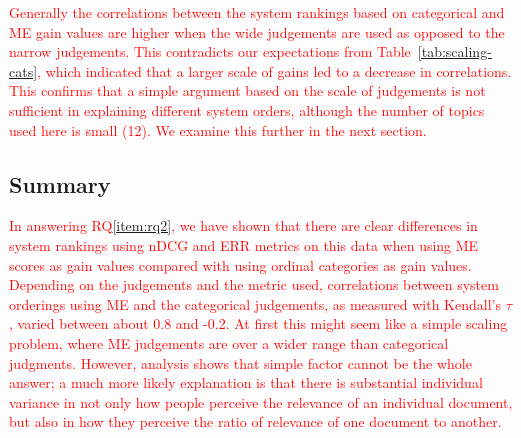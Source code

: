 \textcolor{red}{
Generally the correlations between the system rankings based on 
categorical and ME gain values are higher when the wide judgements
are used as opposed to the narrow judgements.
This contradicts our expectations from 
Table~\ref{tab:scaling-cats}, which indicated that
a larger scale of gains led to a decrease in correlations.
This confirms that a simple argument based on the scale 
of judgements is not sufficient in explaining different system orders, 
although the number of topics used here is small (12).
We examine this further in the next section.
}



\subsection{Summary}
\label{sec:summary-7}

\textcolor{red}{ In answering RQ\ref{item:rq2}, we have shown that
there are clear differences in system rankings using nDCG and ERR
metrics on this data when using ME scores as gain values compared with
using ordinal categories as gain values.
Depending on the judgements and the metric used, correlations between
system orderings using ME and the categorical judgements, as measured
with Kendall's $\tau$, varied between about 0.8 and -0.2. At first this
might seem like a simple scaling problem, where ME judgements are over
a wider range than categorical judgments.
However, analysis shows that simple factor cannot be the whole answer;
a much more likely explanation is that there is substantial individual
variance in not only how people perceive the relevance of an individual
document, but also in how they perceive the ratio of relevance of one
document to another.
} 
 


